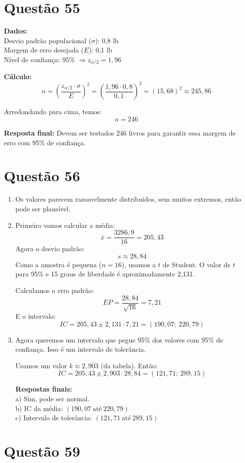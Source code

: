 \documentclass[12pt]{article}
\newcommand{\quest}[1]{\section*{Questão #1}} %
\begin{document}
\quest{55}

\textbf{Dados:}\\
Desvio padrão populacional ($\sigma$): 0,8 lb\\
Margem de erro desejada ($E$): 0,1 lb\\
Nível de confiança: 95\% $\Rightarrow z_{\alpha/2} = 1{,}96$

\textbf{Cálculo:}
\[
    n = \left( \frac{z_{\alpha/2} \cdot \sigma}{E} \right)^2 = \left( \frac{1{,}96 \cdot 0{,}8}{0{,}1} \right)^2 = (15{,}68)^2 \approx 245{,}86
\]

Arredondando para cima, temos:
\[
    \boxed{n = 246}
\]

\textbf{Resposta final:} Devem ser testados 246 livros para garantir essa margem de erro com 95\% de confiança.


\quest{56}

\begin{enumerate}
    \item Os valores parecem razoavelmente distribuídos, sem muitos extremos, então pode ser plausível.

    \item Primeiro vamos calcular a média:
    \[ 
    \bar{x} = \frac{3286{,}9}{16} = 205{,}43
    \]
    Agora o desvio padrão:
    \[ 
    s \approx 28{,}84
    \]
    Como a amostra é pequena ($n=16$), usamos a $t$ de Student. O valor de $t$ para 95\% e 15 graus de liberdade é aproximadamente 2{,}131.

    Calculamos o erro padrão:
    \[ 
    EP = \frac{28{,}84}{\sqrt{16}} = 7{,}21
    \]
    E o intervalo:
    \[ 
    IC = 205{,}43 \pm 2{,}131 \cdot 7{,}21 = (190{,}07;\ 220{,}79)
    \]

    \item Agora queremos um intervalo que pegue 95\% dos valores com 95\% de confiança. Isso é um intervalo de tolerância.

    Usamos um valor $k \approx 2{,}903$ (da tabela). Então:
    \[ 
    IC = 205{,}43 \pm 2{,}903 \cdot 28{,}84 = (121{,}71;\ 289{,}15)
    \]

    \textbf{Respostas finais:}\\
    a) Sim, pode ser normal.\\
    b) IC da média: $\boxed{(190{,}07\ \text{até}\ 220{,}79)}$\\
    c) Intervalo de tolerância: $\boxed{(121{,}71\ \text{até}\ 289{,}15)}$
\end{enumerate}

\quest{59}
\end{document}
